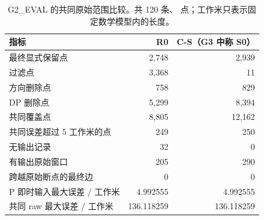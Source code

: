 \begin{table}[H]
\centering\small
\caption{G2\_EVAL 的共同原始范围比较。共 120 条、\GTwoEvalPoints{} 点；工作米只表示固定数学模型内的长度。}
\begin{tabular}{lrr}
\toprule 指标 & R0 & C-S（G3 中称 S0） \\ \midrule
最终显式保留点 & 2,748 & 2,939 \\
过滤点 & 3,368 & 11 \\
方向删除点 & 758 & 829 \\
DP 删除点 & 5,299 & 8,394 \\
共同覆盖点 & 8,805 & 12,162 \\
共同误差超过 5 工作米的点 & 249 & 250 \\
无输出记录 & 32 & 0 \\
有输出原始窗口 & 205 & 290 \\
跨越原始断点的最终边 & 0 & 0 \\
P 即时输入最大误差 / 工作米 & 4.992555 & 4.992555 \\
共同 raw 最大误差 / 工作米 & 136.118259 & 136.118259 \\
\bottomrule\end{tabular}
\end{table}
